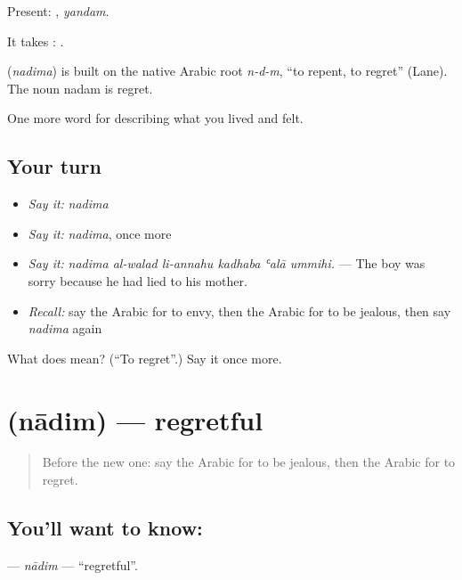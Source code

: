 Present: , \emph{yandam}.

It takes :    .

\begin{cousinweb}
\textbf{} (\emph{nadima}) is built on the native Arabic root \emph{n-d-m}, \textquotedblleft{}to repent, to regret\textquotedblright{} (Lane). The noun nadam is regret.
\end{cousinweb}

\begin{grammarlens}[title={What you've built}]
One more word for describing what you lived and felt.
\end{grammarlens}

\subsection*{Your turn}
\begin{itemize}
\raggedright
  \item \emph{Say it:} \emph{nadima}
  \item \emph{Say it:} \emph{nadima}, once more
  \item \emph{Say it:} \emph{nadima al-walad li-annahu kadhaba ʿalā ummihi.} — The boy was sorry because he had lied to his mother.
  \item \emph{Recall:} say the Arabic for to envy, then the Arabic for to be jealous, then say \emph{nadima} again
\end{itemize}

\begin{tcolorbox}[breakable,colback=teal!4,colframe=teal!35!black,title={Before you move on}]
What does  mean? (\textquotedblleft{}To regret\textquotedblright{}.) Say it once more.
\end{tcolorbox}
\section[\texorpdfstring{\ar{نادم} (nādim)}{نادم (nādim)}]{ (nādim) — regretful}

\label{lesson:AR-C493-nadim}



\begin{quote}
Before the new one: say the Arabic for to be jealous, then the Arabic for to regret.
\end{quote}

\subsection*{You'll want to know: }
\textbf{} — \emph{nādim} — \textquotedblleft{}regretful\textquotedblright{}.

